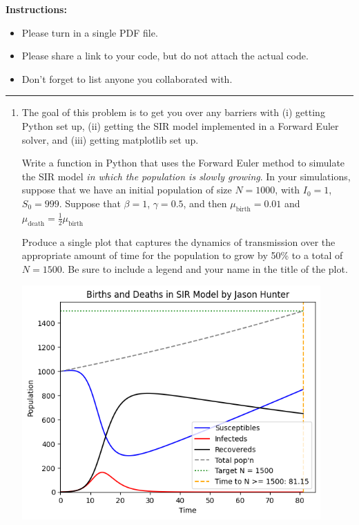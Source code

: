 \documentclass[11pt]{article}
\begin{document}
\renewcommand{\headrulewidth}{0.4pt}

{\bf Instructions:} 
\begin{itemize}[itemsep=-7pt]
	\item Please turn in a single PDF file.
	\item Please share a link to your code, but do not attach the actual code. 
	\item Don't forget to list anyone you collaborated with. 
\end{itemize}
\vspace{0.1in}\hrule

\begin{enumerate}

\item The goal of this problem is to get you over any barriers with 
(i) getting Python set up, 
(ii) getting the SIR model implemented in a Forward Euler solver, and
(iii) getting matplotlib set up.

Write a function in Python that uses the Forward Euler method to simulate the SIR model {\it
in which the population is slowly growing}.
In your simulations, suppose that we have an initial population of size $N=1000$, with $I_0=1$, $S_0=999$.
Suppose that
$\beta=1$, $\gamma=0.5$,
and then
$\mu_{\text{birth}}=0.01$
and
$\mu_{\text{death}} = \tfrac{1}{2} \mu_\text{birth}$

Produce a single plot that captures the dynamics of transmission over the appropriate amount of time
for the population to grow by 50\% to a total of $N=1500$.
Be sure to include a legend and your name in the title of the plot.

\begin{center}
  \includegraphics[width=0.9\textwidth, height=0.6\textheight, keepaspectratio]{births-and-deaths.png}
\end{center}


\end{enumerate}
\end{document}
